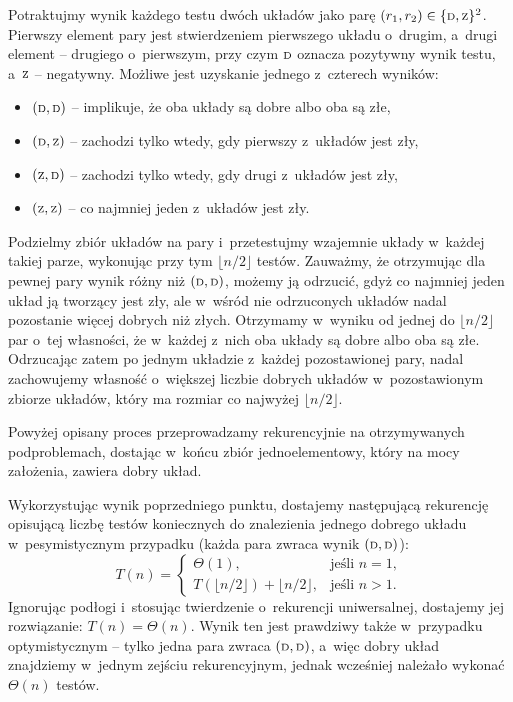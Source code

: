 \subproblem %
Potraktujmy wynik każdego testu dwóch układów jako parę $(r_1,r_2)\in\{{\scriptstyle\rm D},{\scriptstyle\rm Z}\}^2$. Pierwszy element pary jest stwierdzeniem pierwszego układu o~drugim, a~drugi element -- drugiego o~pierwszym, przy czym ${\scriptstyle\rm D}$ oznacza pozytywny wynik testu, a~${\scriptstyle\rm Z}$ -- negatywny. Możliwe jest uzyskanie jednego z~czterech wyników:
\begin{itemize}
	\item $({\scriptstyle\rm D},{\scriptstyle\rm D})$ -- implikuje, że oba układy są dobre albo oba są złe,
	\item $({\scriptstyle\rm D},{\scriptstyle\rm Z})$ -- zachodzi tylko wtedy, gdy pierwszy z~układów jest zły,
	\item $({\scriptstyle\rm Z},{\scriptstyle\rm D})$ -- zachodzi tylko wtedy, gdy drugi z~układów jest zły,
	\item $({\scriptstyle\rm Z},{\scriptstyle\rm Z})$ -- co najmniej jeden z~układów jest zły.
\end{itemize}

Podzielmy zbiór układów na pary i~przetestujmy wzajemnie układy w~każdej takiej parze, wykonując przy tym $\lfloor n/2\rfloor$ testów. Zauważmy, że otrzymując dla pewnej pary wynik różny niż $({\scriptstyle\rm D},{\scriptstyle\rm D})$, możemy ją odrzucić, gdyż co najmniej jeden układ ją tworzący jest zły, ale w~wśród nie odrzuconych układów nadal pozostanie więcej dobrych niż złych. Otrzymamy w~wyniku od jednej do $\lfloor n/2\rfloor$ par o~tej własności, że w~każdej z~nich oba układy są dobre albo oba są złe. Odrzucając zatem po jednym układzie z~każdej pozostawionej pary, nadal zachowujemy własność o~większej liczbie dobrych układów w~pozostawionym zbiorze układów, który ma rozmiar co najwyżej $\lfloor n/2\rfloor$.

Powyżej opisany proces przeprowadzamy rekurencyjnie na otrzymywanych podproblemach, dostając w~końcu zbiór jednoelementowy, który na mocy założenia, zawiera dobry układ.

\subproblem %
Wykorzystując wynik poprzedniego punktu, dostajemy następującą rekurencję opisującą liczbę testów koniecznych do znalezienia jednego dobrego układu w~pesymistycznym przypadku (każda para zwraca wynik $({\scriptstyle\rm D},{\scriptstyle\rm D})$):
\[
	T(n) =
	\begin{cases}
		\Theta(1), & \text{jeśli $n=1$}, \\
		T(\lfloor n/2\rfloor) + \lfloor n/2\rfloor, & \text{jeśli $n>1$}.
	\end{cases}
\]
Ignorując podłogi i~stosując twierdzenie o~rekurencji uniwersalnej, dostajemy jej rozwiązanie: $T(n)=\Theta(n)$. Wynik ten jest prawdziwy także w~przypadku optymistycznym -- tylko jedna para zwraca $({\scriptstyle\rm D},{\scriptstyle\rm D})$, a~więc dobry układ znajdziemy w~jednym zejściu rekurencyjnym, jednak wcześniej należało wykonać $\Theta(n)$ testów.

